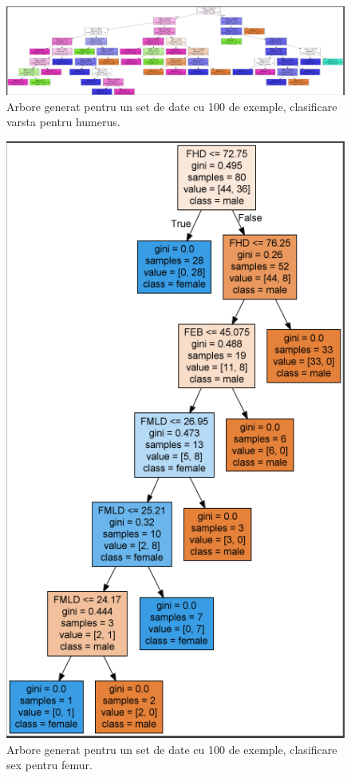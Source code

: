 \documentclass[runningheads,a4paper,11pt]{report}
\begin{document}
\begin{figure}
\centerline{\includegraphics[width=20cm,keepaspectratio]{Imagini/tree_age_humerus_100.png}}
\caption{Arbore generat pentru un set de date cu 100 de exemple, clasificare varsta pentru humerus.}
\label{fig}
\end{figure}

\begin{figure}
\centerline{\includegraphics{Imagini/tree_sex_femur_100.PNG}}
\caption{Arbore generat pentru un set de date cu 100 de exemple, clasificare sex pentru femur.}
\label{fig}
\end{figure}
\end{document}
